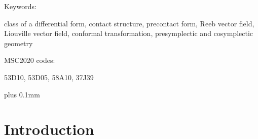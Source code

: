 \documentclass[11pt,twoside]{article}
\theoremstyle{plain}
\theoremstyle{definition}
\begin{document}
{\large\bf\raggedright
    Keywords:
}
class of a differential form, contact structure, precontact form, Reeb vector field, Liouville vector field, conformal transformation, presymplectic and cosymplectic geometry
\medskip

{\large\bf\raggedright
    MSC2020 codes:
}
53D10,
53D05,
58A10,
37J39

\medskip



{\setcounter{tocdepth}{2}
\def\baselinestretch{0.79}
\small
\def\addvspace#1{\vskip 1pt}
\parskip 0pt plus 0.1mm
\tableofcontents
}


\newpage

\pagestyle{fancy}

\fancyhead[RE]{}
\fancyhead[LO]{}    %

\fancyfoot[L]{}     %
\fancyfoot[C]{\thepage}                  %
\fancyfoot[R]{}            %

\setlength{\headheight}{17pt}

\renewcommand{\headrulewidth}{0.1pt}  %
\renewcommand{\footrulewidth}{0pt}    %

\renewcommand{\headrule}{%
    \vspace{3pt}                %
    \hrule width\headwidth height 0.4pt %
    \vspace{0pt}                %
}

\setlength{\headsep}{30pt}  %

\section{Introduction}
\end{document}
